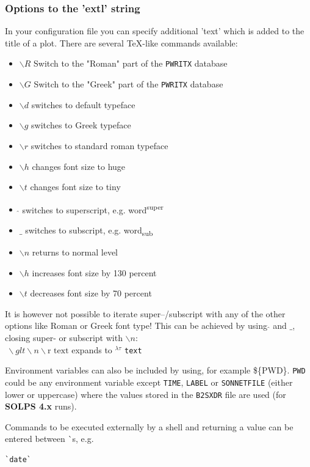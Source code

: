 \documentclass[a4paper,10pt]{report}
\newcommand\SOLPSfour{{\bf SOLPS 4.x} }
\begin{document}
\subsubsection{Options to the 'extl' string}
In your configuration file you can specify additional 'text' which
is added to the title of a plot.
There are several \TeX\--like commands available:
\begin{itemize}
\item $\backslash R$ Switch to the "Roman" part of the {\tt PWRITX} database
\item $\backslash G$ Switch to the "Greek" part of the {\tt PWRITX} database
\item $\backslash d$ switches to default typeface
\item $\backslash g$ switches to Greek typeface
\item $\backslash r$ switches to standard roman typeface
\item $\backslash h$ changes font size to huge
\item $\backslash t$ changes font size to tiny
\item $\hat{}$ switches to superscript, e.g. word\textsuperscript{super}
\item $\_$ switches to subscript, e.g. word\textsubscript{sub}
\item $\backslash n$ returns to normal level
\item $\backslash h$ increases font size by 130 percent
\item $\backslash t$ decreases font size by 70 percent
\end{itemize}
It is however not possible to iterate super--/subscript with any of the
other options like Roman or Greek font type!
This can be achieved by using $\hat{}$ and $\_$, closing super- or subscript
with $\backslash n$: \\
$ \hat{} ~ \backslash g lt\backslash n\backslash\mbox{r text}$ expands to
$^{\lambda\tau}$ {\tt text}

Environment variables can also be included by using, for example
\$\{PWD\}.  {\tt PWD} could be any environment variable except {\tt TIME},
{\tt LABEL} or {\tt SONNETFILE} (either lower or uppercase) where the
values stored in the {\tt B2SXDR} file are used (for \SOLPSfour runs).

Commands to be executed externally by a shell and returning a value can be
entered between \`{}s, e.g.
\begin{verbatim}
`date`
\end{verbatim}
\end{document}
